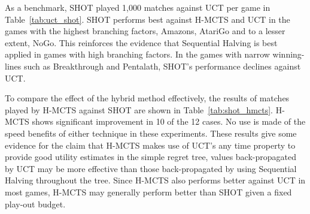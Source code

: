 \documentclass{kecsmstr}
\begin{document}
As a benchmark, SHOT played 1,000 matches against UCT per game in Table~\ref{tab:uct_shot}. SHOT performs best against H-MCTS and UCT in the games with the highest branching factors, Amazons, AtariGo and to a lesser extent, NoGo. This reinforces the evidence that Sequential Halving is best applied in games with high branching factors. In the games with narrow winning-lines such as Breakthrough and Pentalath, SHOT's performance declines against UCT.

\begin{table}[ht]
\centering
\tabcolsep=0.3cm
\vspace{3mm}
{\caption{H-MCTS vs. SHOT with random play-outs, 1,000 games} \label{tab:shot_hmcts}}
\end{table}

To compare the effect of the hybrid method effectively, the results of matches played by H-MCTS against SHOT are shown in Table~\ref{tab:shot_hmcts}. H-MCTS shows significant improvement in 10 of the 12 cases. No use is made of the speed benefits of either technique in these experiments. These results give some evidence for the claim that H-MCTS makes use of UCT's any time property to provide good utility estimates in the simple regret tree, values back-propagated by UCT may be more effective than those back-propagated by using Sequential Halving throughout the tree. Since H-MCTS also performs better against UCT in most games, H-MCTS may generally perform better than SHOT given a fixed play-out budget.
\end{document}

